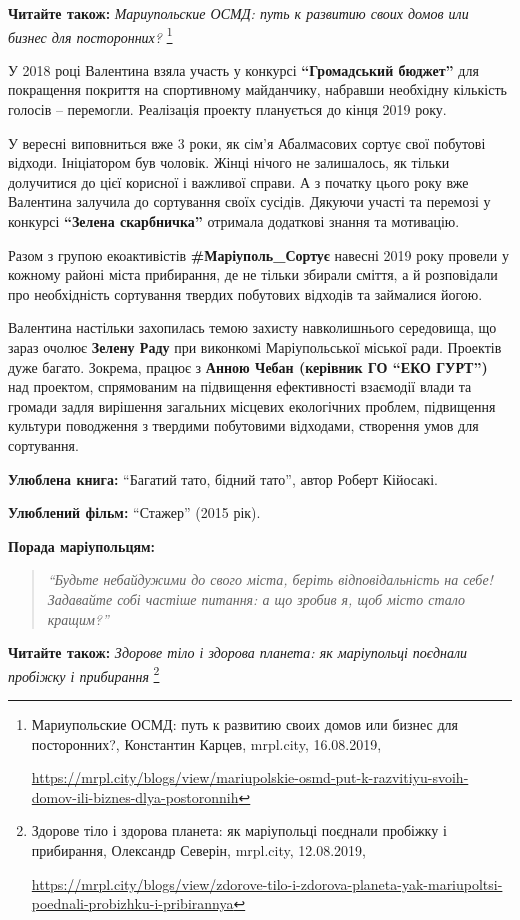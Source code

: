 \textbf{Читайте також:} \emph{Мариупольские ОСМД: путь к развитию своих домов или бизнес для посторонних?}%
\footnote{Мариупольские ОСМД: путь к развитию своих домов или бизнес для посторонних?, Константин Карцев, mrpl.city, 16.08.2019, \par%
\url{https://mrpl.city/blogs/view/mariupolskie-osmd-put-k-razvitiyu-svoih-domov-ili-biznes-dlya-postoronnih}
}

У 2018 році Валентина взяла участь у конкурсі \textbf{\enquote{Громадський бюджет}} для
покращення покриття на спортивному майданчику, набравши необхідну кількість
голосів – перемогли. Реалізація проекту планується до кінця 2019 року.


У вересні виповниться вже 3 роки, як сім'я Абалмасових сортує свої побутові
відходи. Ініціатором був чоловік. Жінці нічого не залишалось, як тільки
долучитися до цієї корисної і важливої справи. А з початку цього року вже
Валентина залучила до сортування своїх сусідів. Дякуючи участі та перемозі у
конкурсі \textbf{\enquote{Зелена скарбничка}} отримала додаткові знання та мотивацію. 

Разом з групою екоактивістів \textbf{\#Маріуполь\_Сортує} навесні 2019 року провели у
кожному районі міста прибирання, де не тільки збирали сміття, а й розповідали
про необхідність сортування твердих побутових відходів та займалися йогою.


Валентина настільки захопилась темою захисту навколишнього середовища, що зараз
очолює \textbf{Зелену Раду} при виконкомі Маріупольської міської ради. Проектів дуже
багато. Зокрема, працює з \textbf{Анною Чебан (керівник ГО \enquote{ЕКО ГУРТ})} над проектом,
спрямованим на підвищення ефективності взаємодії влади та громади задля
вирішення загальних місцевих екологічних проблем, підвищення культури
поводження з твердими побутовими відходами, створення умов для сортування. 

\textbf{Улюблена книга:} \enquote{Багатий тато, бідний тато}, автор Роберт Кійосакі.

\textbf{Улюблений фільм:} \enquote{Стажер} (2015 рік).

\textbf{Порада маріупольцям:} 

\begin{quote}
\em\enquote{Будьте небайдужими до свого міста, беріть
відповідальність на себе! Задавайте собі частіше питання: а що зробив я, щоб
місто стало кращим?}
\end{quote}

\textbf{Читайте також:} \emph{Здорове тіло і здорова планета: як маріупольці поєднали пробіжку і прибирання}%
\footnote{Здорове тіло і здорова планета: як маріупольці поєднали пробіжку і прибирання, Олександр Северін, mrpl.city, 12.08.2019, \par%
\url{https://mrpl.city/blogs/view/zdorove-tilo-i-zdorova-planeta-yak-mariupoltsi-poednali-probizhku-i-pribirannya}
}

